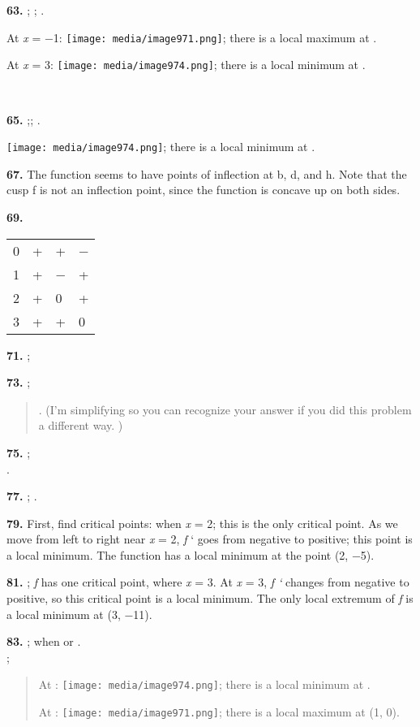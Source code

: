 \textbf{63.} ; ; .

At \emph{x} = −1:
\texttt{[image: media/image971.png]};
there is a local maximum at .

At \emph{x} = 3:
\texttt{[image: media/image974.png]};
there is a local minimum at .

\textbf{\\
}

\textbf{65.} ;; .

\texttt{[image: media/image974.png]};
there is a local minimum at .

\textbf{67.} The function seems to have points of inflection at b, d,
and h. Note that the cusp f is not an inflection point, since the
function is concave up on both sides.

\textbf{69.}

\begin{longtable}[]{@{}llll@{}}
\toprule
0 & + & + & −\tabularnewline
1 & + & − & +\tabularnewline
2 & + & 0 & +\tabularnewline
3 & + & + & 0\tabularnewline
\bottomrule
\end{longtable}

\textbf{71.} ;

\textbf{73.} ;

\begin{quote}
. (I'm simplifying so you can recognize your answer if you did this
problem a different way. )
\end{quote}

\textbf{75.} ;\\
.

\textbf{77.} ; .

\textbf{79.} First, find critical points: when \emph{x} = 2; this is the
only critical point. As we move from left to right near \emph{x} = 2,
\emph{f} ` goes from negative to positive; this point is a local
minimum. The function has a local minimum at the point (2, −5).

\textbf{81.} ; \emph{f} has one critical point, where \emph{x} = 3. At
\emph{x} = 3, \emph{f `} changes from negative to positive, so this
critical point is a local minimum. The only local extremum of \emph{f}
is a local minimum at (3, −11).

\textbf{83.} ; when or .\\
;

\begin{quote}
At :
\texttt{[image: media/image974.png]};
there is a local minimum at .

At :
\texttt{[image: media/image971.png]};
there is a local maximum at (1, 0).
\end{quote}

